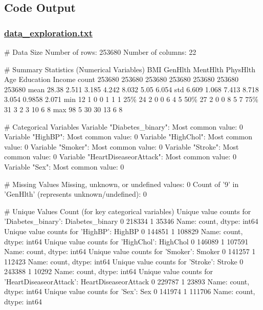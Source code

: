 \documentclass[11pt]{article}
\begin{document}
\subsection{Code Output}\hypertarget{file-data-exploration-txt}{}

\subsubsection*{\hyperlink{code-Data Exploration-data-exploration-txt}{data\_exploration.txt}}

\begin{codeoutput}
\# Data Size
Number of rows: 253680
Number of columns: 22

\# Summary Statistics (Numerical Variables)
         BMI GenHlth MentHlth PhysHlth    Age Education Income
count 253680  253680   253680   253680 253680    253680 253680
mean   28.38   2.511    3.185    4.242  8.032      5.05  6.054
std    6.609   1.068    7.413    8.718  3.054    0.9858  2.071
min       12       1        0        0      1         1      1
25\%       24       2        0        0      6         4      5
50\%       27       2        0        0      8         5      7
75\%       31       3        2        3     10         6      8
max       98       5       30       30     13         6      8

\# Categorical Variables
Variable "Diabetes\_binary": Most common value: 0
Variable "HighBP": Most common value: 0
Variable "HighChol": Most common value: 0
Variable "Smoker": Most common value: 0
Variable "Stroke": Most common value: 0
Variable "HeartDiseaseorAttack": Most common value: 0
Variable "Sex": Most common value: 0

\# Missing Values
Missing, unknown, or undefined values: 0
Count of '9' in 'GenHlth' (represents unknown/undefined): 0

\# Unique Values Count (for key categorical variables)
Unique value counts for 'Diabetes\_binary': 
Diabetes\_binary
0    218334
1     35346
Name: count, dtype: int64
Unique value counts for 'HighBP': 
HighBP
0    144851
1    108829
Name: count, dtype: int64
Unique value counts for 'HighChol': 
HighChol
0    146089
1    107591
Name: count, dtype: int64
Unique value counts for 'Smoker': 
Smoker
0    141257
1    112423
Name: count, dtype: int64
Unique value counts for 'Stroke': 
Stroke
0    243388
1     10292
Name: count, dtype: int64
Unique value counts for 'HeartDiseaseorAttack': 
HeartDiseaseorAttack
0    229787
1     23893
Name: count, dtype: int64
Unique value counts for 'Sex': 
Sex
0    141974
1    111706
Name: count, dtype: int64
\end{codeoutput}
\end{document}
